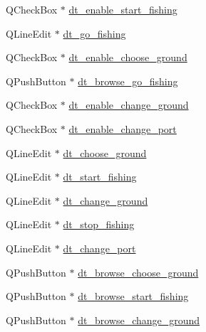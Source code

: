 \begin{DoxyCompactItemize}
\item 
Q\+Check\+Box $\ast$ \mbox{\hyperlink{class_ui___scenario_dialog_ab45a4ba1d33827ccadbfb60c436b1f99}{dt\+\_\+enable\+\_\+start\+\_\+fishing}}
\item 
Q\+Line\+Edit $\ast$ \mbox{\hyperlink{class_ui___scenario_dialog_a407636b8e74c10ab9a41375565d656d6}{dt\+\_\+go\+\_\+fishing}}
\item 
Q\+Check\+Box $\ast$ \mbox{\hyperlink{class_ui___scenario_dialog_aa11b6bc7ef21dd347c2282c8b16174f3}{dt\+\_\+enable\+\_\+choose\+\_\+ground}}
\item 
Q\+Push\+Button $\ast$ \mbox{\hyperlink{class_ui___scenario_dialog_ae80ae6d18354208d99152c1079f9ce89}{dt\+\_\+browse\+\_\+go\+\_\+fishing}}
\item 
Q\+Check\+Box $\ast$ \mbox{\hyperlink{class_ui___scenario_dialog_ab70e23f7ca7a00d47b92f76aa7e3827d}{dt\+\_\+enable\+\_\+change\+\_\+ground}}
\item 
Q\+Check\+Box $\ast$ \mbox{\hyperlink{class_ui___scenario_dialog_a9eeb7de0dac6447aac59f82e0d544785}{dt\+\_\+enable\+\_\+change\+\_\+port}}
\item 
Q\+Line\+Edit $\ast$ \mbox{\hyperlink{class_ui___scenario_dialog_a38e4cc6668b6aba9600b9fc2c7e05153}{dt\+\_\+choose\+\_\+ground}}
\item 
Q\+Line\+Edit $\ast$ \mbox{\hyperlink{class_ui___scenario_dialog_a09f73880abc2fa5975aff3ac8acab38c}{dt\+\_\+start\+\_\+fishing}}
\item 
Q\+Line\+Edit $\ast$ \mbox{\hyperlink{class_ui___scenario_dialog_ad1e2c1a6b0c15ca028c9c3810b976693}{dt\+\_\+change\+\_\+ground}}
\item 
Q\+Line\+Edit $\ast$ \mbox{\hyperlink{class_ui___scenario_dialog_aea86985bd80f8212baf67fd0315adbd6}{dt\+\_\+stop\+\_\+fishing}}
\item 
Q\+Line\+Edit $\ast$ \mbox{\hyperlink{class_ui___scenario_dialog_ab1fbddb4fdd43be9864a5e97d8745f56}{dt\+\_\+change\+\_\+port}}
\item 
Q\+Push\+Button $\ast$ \mbox{\hyperlink{class_ui___scenario_dialog_a592cfe2168e4f90523668d17909ce2db}{dt\+\_\+browse\+\_\+choose\+\_\+ground}}
\item 
Q\+Push\+Button $\ast$ \mbox{\hyperlink{class_ui___scenario_dialog_a95566e47ba4c42a74c121792920f9c40}{dt\+\_\+browse\+\_\+start\+\_\+fishing}}
\item 
Q\+Push\+Button $\ast$ \mbox{\hyperlink{class_ui___scenario_dialog_ab166fb27754debc770ad1f6d795fee96}{dt\+\_\+browse\+\_\+change\+\_\+ground}}
\item 

\end{DoxyCompactItemize}
